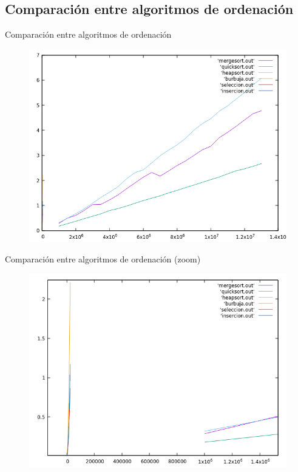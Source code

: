 \documentclass{beamer}
\begin{document}
\subsection{Comparación entre algoritmos de ordenación}

\begin{frame}[fragile]{Comparación entre algoritmos de ordenación}
\begin{figure}[H]
\centering
\includegraphics[scale=0.5]{empirica_ordenacion_comparacion.png}
\end{figure}
\end{frame}

\begin{frame}[fragile]{Comparación entre algoritmos de ordenación (zoom)}
\begin{figure}[H]
\centering
\includegraphics[scale=0.5]{empirica_ordenacion_comparacion_zoom.png}
\end{figure}
\end{frame}
\end{document}
